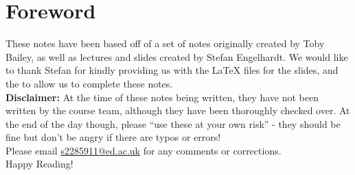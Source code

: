 \section*{Foreword}
These notes have been based off of a set of notes originally created by Toby Bailey, as well as lectures and slides created by Stefan Engelhardt. We would like to thank Stefan for kindly providing us with the LaTeX files for the slides, and the  to allow us to complete these notes.\\ \linebreak
\textbf{Disclaimer:} At the time of these notes being written, they have not been written by the course team, although they have been thoroughly checked over. At the end of the day though, please ``use these at your own risk'' - they should be fine but don't be angry if there are typos or errors!\\ \linebreak
Please email \href{mailto:s2285911@ed.ac.uk}{s2285911@ed.ac.uk} for any comments or corrections.\\ \linebreak
Happy Reading!
